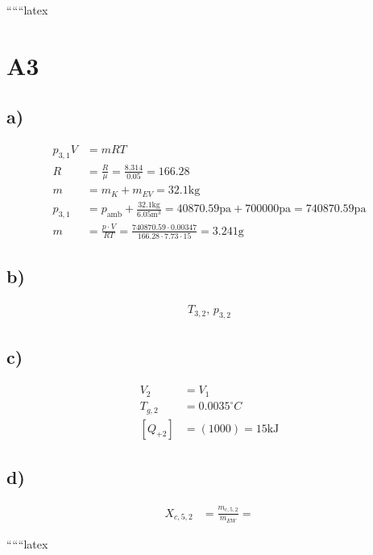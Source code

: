 
``````latex


\section*{A3}

\subsection*{a)}
\begin{align*}
    p_{3,1} V &= mRT \\
    R &= \frac{R}{\mu} = \frac{8.314}{0.05} = 166.28 \\
    m &= m_K + m_{EV} = 32.1 \text{kg} \\
    p_{3,1} &= p_{\text{amb}} + \frac{32.1 \text{kg}}{6.05 \text{m}^3} = 40870.59 \text{pa} + 700000 \text{pa} = 740870.59 \text{pa} \\
    m &= \frac{p \cdot V}{RT} = \frac{740870.59 \cdot 0.00347}{166.28 \cdot 7.73 \cdot 15} = 3.241 \text{g}
\end{align*}

\subsection*{b)}
\begin{align*}
    T_{3,2}, \, p_{3,2}
\end{align*}

\subsection*{c)}
\begin{align*}
    V_2 &= V_1 \\
    T_{g,2} &= 0.0035^\circ C \\
    [Q_{+2}] &= (1000) = 15 \text{kJ}
\end{align*}

\subsection*{d)}
\begin{align*}
    X_{c,5,2} &= \frac{m_{c,5,2}}{m_{EW}} = 
\end{align*}

``````latex



